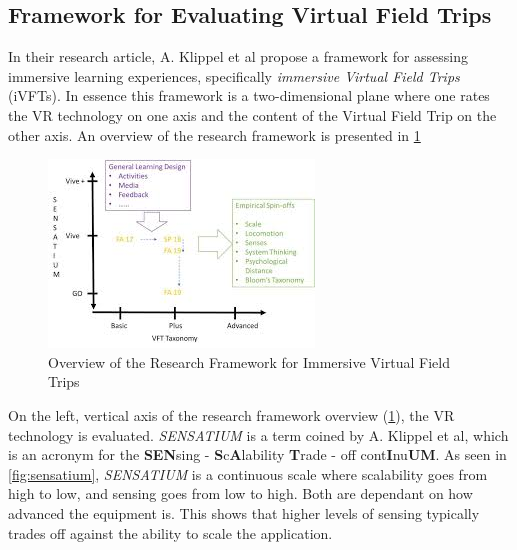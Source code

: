     \subsection{Framework for Evaluating Virtual Field Trips}
        \label{sec:framework}
        In their research article, A. Klippel et al \cite{research_framework} propose a framework for assessing immersive learning experiences, specifically \emph{immersive Virtual Field Trips} (iVFTs). In essence this framework is a two-dimensional plane where one rates the VR technology on one axis and the content of the Virtual Field Trip on the other axis. An overview of the research framework is presented in \cref{fig:framework}
        
        \FloatBarrier
        \begin{figure}[!ht]
            \centering
            \includegraphics[width=0.7\linewidth]{figures/framework.jpg}
            \caption{Overview of the Research Framework for Immersive Virtual Field Trips}
            \label{fig:framework}
        \end{figure}
        \FloatBarrier
        
        On the left, vertical axis of the research framework overview (\cref{fig:framework}), the VR technology is evaluated. \emph{SENSATIUM} is a term coined by A. Klippel et al, which is an acronym for the \textbf{SEN}sing - \textbf{S}c\textbf{A}lability \textbf{T}rade - off cont\textbf{I}nu\textbf{UM}. As seen in \cref{fig:sensatium}, \emph{SENSATIUM} is a continuous scale where scalability goes from high to low, and sensing goes from low to high. Both are dependant on how advanced the equipment is. This shows that higher levels of sensing typically trades off against the ability to scale the application.
        
